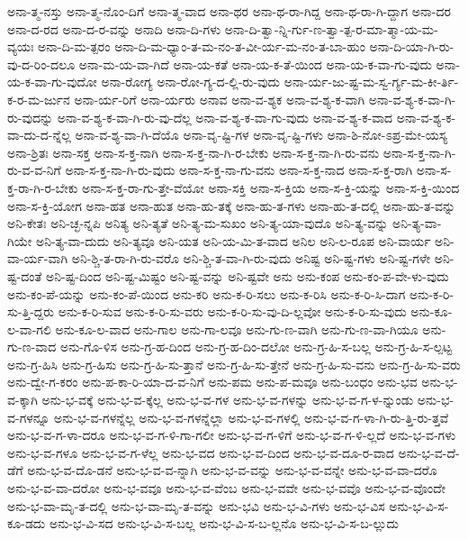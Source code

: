 {ಅನಾ-ತ್ಮ-ನಸ್ತು
ಅನಾ-ತ್ಮ-ನೊಂ-ದಿಗೆ
ಅನಾ-ತ್ಮ-ವಾದ
ಅನಾ-ಥರ
ಅನಾ-ಥ-ರಾ-ಗಿದ್ದ
ಅನಾ-ಥ-ರಾ-ಗಿ-ದ್ದಾಗ
ಅನಾ-ದರ
ಅನಾ-ದ-ರದ
ಅನಾ-ದ-ರ-ವನ್ನು
ಅನಾದಿ
ಅನಾ-ದಿ-ಗಳು
ಅನಾ-ದಿ-ತ್ವಾ-ನ್ನಿ-ರ್ಗು-ಣ-ತ್ವಾ-ತ್ಪ-ರ-ಮಾ-ತ್ಮಾ-ಯ-ಮ-ವ್ಯಯಃ
ಅನಾ-ದಿ-ಮ-ತ್ಪರಂ
ಅನಾ-ದಿ-ಮ-ಧ್ಯಾಂ-ತ-ಮ-ನಂ-ತ-ವೀ-ರ್ಯ-ಮ-ನಂ-ತ-ಬಾ-ಹುಂ
ಅನಾ-ದಿ-ಯಾ-ಗಿ-ರು-ವು-ದ-ರಿಂ-ದಲೂ
ಅನಾ-ಮ-ಯ-ವಾ-ಗಿದೆ
ಅನಾ-ಯ-ಕತೆ
ಅನಾ-ಯ-ಕ-ತೆ-ಯಿಂದ
ಅನಾ-ಯ-ಕ-ವಾ-ಗು-ವುದು
ಅನಾ-ಯ-ಕ-ವಾ-ಗು-ವುದೋ
ಅನಾ-ರೋಗ್ಯ
ಅನಾ-ರೋ-ಗ್ಯ-ದ-ಲ್ಲಿ-ರು-ವುದು
ಅನಾ-ರ್ಯ-ಜು-ಷ್ಟ-ಮ-ಸ್ವ-ರ್ಗ್ಯ-ಮ-ಕೀ-ರ್ತಿ-ಕ-ರ-ಮ-ರ್ಜುನ
ಅನಾ-ರ್ಯ-ರಿಗೆ
ಅನಾ-ರ್ಯರು
ಅನಾವ
ಅನಾ-ವ-ಶ್ಯಕ
ಅನಾ-ವ-ಶ್ಯ-ಕ-ವಾಗಿ
ಅನಾ-ವ-ಶ್ಯ-ಕ-ವಾ-ಗಿ-ರು-ವುದನ್ನು
ಅನಾ-ವ-ಶ್ಯ-ಕ-ವಾ-ಗಿ-ರು-ವು-ದೆಲ್ಲ
ಅನಾ-ವ-ಶ್ಯ-ಕ-ವಾ-ಗು-ವುದು
ಅನಾ-ವ-ಶ್ಯ-ಕ-ವಾದ
ಅನಾ-ವ-ಶ್ಯ-ಕ-ವಾ-ದು-ದ-ನ್ನೆಲ್ಲ
ಅನಾ-ವ-ಶ್ಯ-ವಾ-ಗಿ-ದೆಯೊ
ಅನಾ-ವೃ-ಷ್ಟಿ-ಗಳ
ಅನಾ-ವೃ-ಷ್ಟಿ-ಗಳು
ಅನಾ-ಶಿ-ನೋ-ಽಪ್ರ-ಮೇ-ಯಸ್ಯ
ಅನಾ-ಶ್ರಿತಃ
ಅನಾ-ಸಕ್ತ
ಅನಾ-ಸ-ಕ್ತ-ನಾಗಿ
ಅನಾ-ಸ-ಕ್ತ-ನಾ-ಗಿ-ರ-ಬೇಕು
ಅನಾ-ಸ-ಕ್ತ-ನಾ-ಗಿ-ರು-ವನು
ಅನಾ-ಸ-ಕ್ತ-ನಾ-ಗಿ-ರು-ವ-ವ-ನಿಗೆ
ಅನಾ-ಸ-ಕ್ತ-ನಾ-ಗಿ-ರು-ವುದು
ಅನಾ-ಸ-ಕ್ತ-ನಾ-ಗು-ವನು
ಅನಾ-ಸ-ಕ್ತ-ನಾದ
ಅನಾ-ಸ-ಕ್ತ-ರಾಗಿ
ಅನಾ-ಸ-ಕ್ತ-ರಾ-ಗಿ-ರ-ಬೇಕು
ಅನಾ-ಸ-ಕ್ತ-ರಾ-ಗು-ತ್ತೇ-ವೆಯೋ
ಅನಾ-ಸಕ್ತಿ
ಅನಾ-ಸ-ಕ್ತಿಯ
ಅನಾ-ಸ-ಕ್ತಿ-ಯನ್ನು
ಅನಾ-ಸ-ಕ್ತಿ-ಯಿಂದ
ಅನಾ-ಸ-ಕ್ತಿ-ಯೋಗ
ಅನಾ-ಹತ
ಅನಾ-ಹುತ
ಅನಾ-ಹು-ತಕ್ಕೆ
ಅನಾ-ಹು-ತ-ಗಳು
ಅನಾ-ಹು-ತ-ದಲ್ಲಿ
ಅನಾ-ಹು-ತ-ವನ್ನು
ಅನಿ-ಕೇತಃ
ಅನಿ-ಚ್ಛ-ನ್ನಪಿ
ಅನಿತ್ಯ
ಅನಿ-ತ್ಯತೆ
ಅನಿ-ತ್ಯ-ಮ-ಸುಖಂ
ಅನಿ-ತ್ಯ-ಯಾ-ವುದೊ
ಅನಿ-ತ್ಯ-ವನ್ನು
ಅನಿ-ತ್ಯ-ವಾ-ಗಿಯೇ
ಅನಿ-ತ್ಯ-ವಾ-ದುದು
ಅನಿ-ತ್ಯವೂ
ಅನಿ-ಯತ
ಅನಿ-ಯ-ಮಿ-ತ-ವಾದ
ಅನಿಲ
ಅನಿ-ಲ-ರೂಪ
ಅನಿ-ವಾರ್ಯ
ಅನಿ-ವಾ-ರ್ಯ-ವಾಗಿ
ಅನಿ-ಶ್ಚಿ-ತ-ರಾ-ಗಿ-ರು-ವರೊ
ಅನಿ-ಶ್ಚಿ-ತ-ವಾ-ಗಿ-ರು-ವುದು
ಅನಿಷ್ಟ
ಅನಿ-ಷ್ಟ-ಗಳು
ಅನಿ-ಷ್ಟ-ಗಳೇ
ಅನಿ-ಷ್ಟ-ದಂತೆ
ಅನಿ-ಷ್ಟ-ದಿಂದ
ಅನಿ-ಷ್ಟ-ಮಿಷ್ಟಂ
ಅನಿ-ಷ್ಟ-ವನ್ನು
ಅನಿ-ಷ್ಟವೇ
ಅನು
ಅನು-ಕಂಪ
ಅನು-ಕಂ-ಪ-ವೇ-ಳು-ವುದು
ಅನು-ಕಂ-ಪೆ-ಯನ್ನು
ಅನು-ಕಂ-ಪೆ-ಯಿಂದ
ಅನು-ಕರಿ
ಅನು-ಕ-ರಿ-ಸಲು
ಅನು-ಕ-ರಿಸಿ
ಅನು-ಕ-ರಿ-ಸಿ-ದಾಗ
ಅನು-ಕ-ರಿ-ಸು-ತ್ತಿ-ದ್ದರು
ಅನು-ಕ-ರಿ-ಸುವ
ಅನು-ಕ-ರಿ-ಸು-ವರು
ಅನು-ಕ-ರಿ-ಸು-ವು-ದಿ-ಲ್ಲವೋ
ಅನು-ಕ-ರಿ-ಸು-ವುದು
ಅನು-ಕೂ-ಲ-ವಾ-ಗಲಿ
ಅನು-ಕೂ-ಲ-ವಾದ
ಅನು-ಗಾಲ
ಅನು-ಗಾ-ಲವೂ
ಅನು-ಗು-ಣ-ವಾಗಿ
ಅನು-ಗು-ಣ-ವಾ-ಗಿಯೂ
ಅನು-ಗು-ಣ-ವಾದ
ಅನು-ಗೊ-ಳಿಸ
ಅನು-ಗ್ರ-ಹ-ದಿಂದ
ಅನು-ಗ್ರ-ಹ-ದಿಂ-ದಲೋ
ಅನು-ಗ್ರ-ಹಿ-ಸ-ಬಲ್ಲ
ಅನು-ಗ್ರ-ಹಿ-ಸ-ಲ್ಪಟ್ಟ
ಅನು-ಗ್ರ-ಹಿಸಿ
ಅನು-ಗ್ರ-ಹಿಸು
ಅನು-ಗ್ರ-ಹಿ-ಸು-ತ್ತಾನೆ
ಅನು-ಗ್ರ-ಹಿ-ಸು-ತ್ತೇನೆ
ಅನು-ಗ್ರ-ಹಿ-ಸು-ವನು
ಅನು-ಗ್ರ-ಹಿ-ಸು-ವರು
ಅನು-ದ್ವೇ-ಗ-ಕರಂ
ಅನು-ಪ-ಕಾ-ರಿ-ಯಾ-ದ-ವ-ನಿಗೆ
ಅನು-ಪಮ
ಅನು-ಪ-ಮವೂ
ಅನು-ಬಂಧಂ
ಅನು-ಭವ
ಅನು-ಭ-ವ-ಕ್ಕಾಗಿ
ಅನು-ಭ-ವಕ್ಕೆ
ಅನು-ಭ-ವ-ಕ್ಕೆಲ್ಲ
ಅನು-ಭ-ವ-ಗಳ
ಅನು-ಭ-ವ-ಗಳನ್ನು
ಅನು-ಭ-ವ-ಗ-ಳ-ನ್ನುಂಡು
ಅನು-ಭ-ವ-ಗಳನ್ನೂ
ಅನು-ಭ-ವ-ಗಳನ್ನೆಲ್ಲ
ಅನು-ಭ-ವ-ಗಳನ್ನೆಲ್ಲಾ
ಅನು-ಭ-ವ-ಗಳಲ್ಲಿ
ಅನು-ಭ-ವ-ಗ-ಳಾ-ಗಿ-ರು-ತ್ತಿ-ರು-ತ್ತವೆ
ಅನು-ಭ-ವ-ಗ-ಳಾ-ದರೂ
ಅನು-ಭ-ವ-ಗ-ಳಿ-ಗಾ-ಗಲೀ
ಅನು-ಭ-ವ-ಗ-ಳಿಗೆ
ಅನು-ಭ-ವ-ಗ-ಳಿ-ಲ್ಲದೆ
ಅನು-ಭ-ವ-ಗಳು
ಅನು-ಭ-ವ-ಗಳೂ
ಅನು-ಭ-ವ-ಗ-ಳೆಲ್ಲ
ಅನು-ಭ-ವದ
ಅನು-ಭ-ವ-ದಿಂದ
ಅನು-ಭ-ವ-ದೂ-ರ-ವಾದ
ಅನು-ಭ-ವ-ದೆ-ಡೆಗೆ
ಅನು-ಭ-ವ-ದೊ-ಡನೆ
ಅನು-ಭ-ವ-ವ-ನ್ನಾಗಿ
ಅನು-ಭ-ವ-ವನ್ನು
ಅನು-ಭ-ವ-ವನ್ನೇ
ಅನು-ಭ-ವ-ವಾ-ದರೊ
ಅನು-ಭ-ವ-ವಾ-ದರೋ
ಅನು-ಭ-ವವೂ
ಅನು-ಭ-ವ-ವೆಂಬ
ಅನು-ಭ-ವವೇ
ಅನು-ಭ-ವವೊ
ಅನು-ಭ-ವ-ವೊಂದೇ
ಅನು-ಭ-ವಾ-ಮೃ-ತ-ದಲ್ಲಿ
ಅನು-ಭ-ವಾ-ಮೃ-ತ-ವನ್ನು
ಅನು-ಭವಿ
ಅನು-ಭ-ವಿ-ಗಳು
ಅನು-ಭ-ವಿಸ
ಅನು-ಭ-ವಿ-ಸ-ಕೂ-ಡದು
ಅನು-ಭ-ವಿ-ಸದ
ಅನು-ಭ-ವಿ-ಸ-ಬಲ್ಲ
ಅನು-ಭ-ವಿ-ಸ-ಬ-ಲ್ಲನೊ
ಅನು-ಭ-ವಿ-ಸ-ಬ-ಲ್ಲುದು
}
